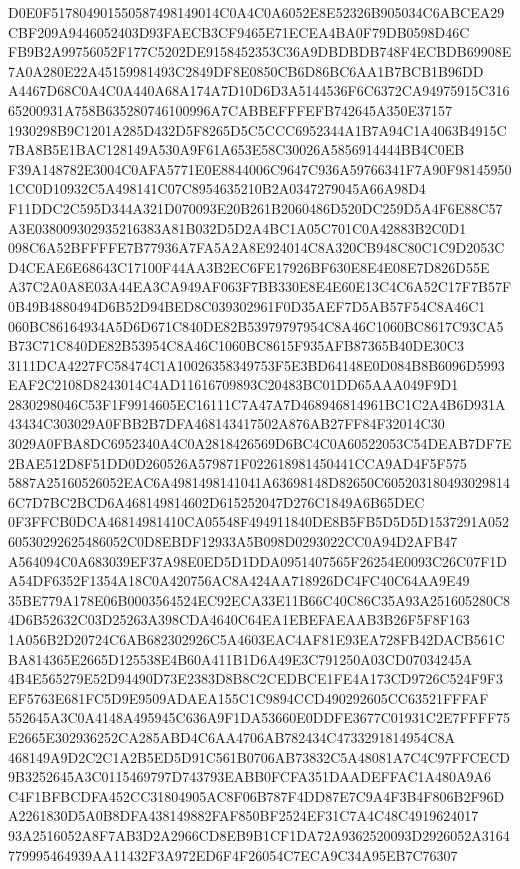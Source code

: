\documentclass[UTF8,fontset=fandol,zihao=-4,a4paper]{ctexart}
\begin{document}
{{D0E0F517804901550587498149014C0A4C0A6052E8E52326B905034C6ABCEA29CBF209A9446052403D93FAECB3CF9465E71ECEA4BA0F79DB0598D46C
FB9B2A99756052F177C5202DE9158452353C36A9DBDBDB748F4ECBDB69908E7A0A280E22A45159981493C2849DF8E0850CB6D86BC6AA1B7BCB1B96DD
A4467D68C0A4C0A440A68A174A7D10D6D3A5144536F6C6372CA94975915C31665200931A758B635280746100996A7CABBEFFFEFB742645A350E37157
1930298B9C1201A285D432D5F8265D5C5CCC6952344A1B7A94C1A4063B4915C7BA8B5E1BAC128149A530A9F61A653E58C30026A5856914444BB4C0EB
F39A148782E3004C0AFA5771E0E8844006C9647C936A59766341F7A90F981459501CC0D10932C5A498141C07C8954635210B2A0347279045A66A98D4
F11DDC2C595D344A321D070093E20B261B2060486D520DC259D5A4F6E88C57A3E038009302935216383A81B032D5D2A4BC1A05C701C0A42883B2C0D1
098C6A52BFFFFE7B77936A7FA5A2A8E924014C8A320CB948C80C1C9D2053CD4CEAE6E68643C17100F44AA3B2EC6FE17926BF630E8E4E08E7D826D55E
A37C2A0A8E03A44EA3CA949AF063F7BB330E8E4E60E13C4C6A52C17F7B57F0B49B4880494D6B52D94BED8C039302961F0D35AEF7D5AB57F54C8A46C1
060BC86164934A5D6D671C840DE82B53979797954C8A46C1060BC8617C93CA5B73C71C840DE82B53954C8A46C1060BC8615F935AFB87365B40DE30C3
3111DCA4227FC58474C1A10026358349753F5E3BD64148E0D084B8B6096D5993EAF2C2108D8243014C4AD11616709893C20483BC01DD65AAA049F9D1
2830298046C53F1F9914605EC16111C7A47A7D468946814961BC1C2A4B6D931A43434C303029A0FBB2B7DFA468143417502A876AB27FF84F32014C30
3029A0FBA8DC6952340A4C0A2818426569D6BC4C0A60522053C54DEAB7DF7E2BAE512D8F51DD0D260526A579871F022618981450441CCA9AD4F5F575
5887A25160526052EAC6A4981498141041A63698148D82650C6052031804930298146C7D7BC2BCD6A468149814602D615252047D276C1849A6B65DEC
0F3FFCB0DCA46814981410CA05548F494911840DE8B5FB5D5D5D1537291A05260530292625486052C0D8EBDF12933A5B098D0293022CC0A94D2AFB47
A564094C0A683039EF37A98E0ED5D1DDA0951407565F26254E0093C26C07F1DA54DF6352F1354A18C0A420756AC8A424AA718926DC4FC40C64AA9E49
35BE779A178E06B0003564524EC92ECA33E11B66C40C86C35A93A251605280C84D6B52632C03D25263A398CDA4640C64EA1EBEFAEAAB3B26F5F8F163
1A056B2D20724C6AB682302926C5A4603EAC4AF81E93EA728FB42DACB561CBA814365E2665D125538E4B60A411B1D6A49E3C791250A03CD07034245A
4B4E565279E52D94490D73E2383D8B8C2CEDBCE1FE4A173CD9726C524F9F3EF5763E681FC5D9E9509ADAEA155C1C9894CCD490292605CC63521FFFAF
552645A3C0A4148A495945C636A9F1DA53660E0DDFE3677C01931C2E7FFFF75E2665E302936252CA285ABD4C6AA4706AB782434C4733291814954C8A
468149A9D2C2C1A2B5ED5D91C561B0706AB73832C5A48081A7C4C97FFCECD9B3252645A3C0115469797D743793EABB0FCFA351DAADEFFAC1A480A9A6
C4F1BFBCDFA452CC31804905AC8F06B787F4DD87E7C9A4F3B4F806B2F96DA2261830D5A0B8DFA438149882FAF850BF2524EF31C7A4C48C4919624017
93A2516052A8F7AB3D2A2966CD8EB9B1CF1DA72A9362520093D2926052A3164779995464939AA11432F3A972ED6F4F26054C7ECA9C34A95EB7C76307
}}
\end{document}

